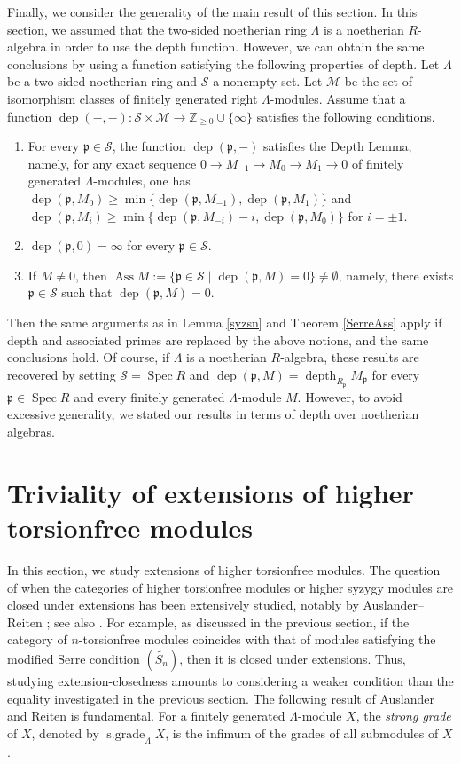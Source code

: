 \documentclass{amsart}
\theoremstyle{definition}
\theoremstyle{remark}
\numberwithin{equation}{thm}
\def\ass{\operatorname{Ass}}
\def\depth{\operatorname{depth}}
\def\ge{\geqslant}
\def\p{\mathfrak{p}}
\def\sgrade{\operatorname{s\text{.}grade}}
\def\spec{\operatorname{Spec}}
\def\ZZ{\mathbb{Z}}
\begin{document}
Finally, we consider the generality of the main result of this section. In this section, we assumed that the two-sided noetherian ring $\Lambda$ is a noetherian $R$-algebra in order to use the depth function. However, we can obtain the same conclusions by using a function satisfying the following properties of depth.
Let $\Lambda$ be a two-sided noetherian ring and $\mathcal{S}$ a nonempty set. Let $\mathcal{M}$ be the set of isomorphism classes of finitely generated right $\Lambda$-modules. Assume that a function $\operatorname{dep}(-,-):\mathcal{S}\times\mathcal{M}\to\ZZ_{\ge0}\cup\{\infty\}$ satisfies the following conditions.
\begin{enumerate}[\rm(1)]
\item For every $\p\in\mathcal{S}$, the function $\operatorname{dep}(\p,-)$ satisfies the Depth Lemma, namely, for any exact sequence $0\to M_{-1}\to M_0\to M_1\to0$ of finitely generated $\Lambda$-modules, one has $\operatorname{dep}(\p,M_0)\ge\min\{\operatorname{dep}(\p,M_{-1}),\operatorname{dep}(\p,M_1)\}$ and $\operatorname{dep}(\p,M_i)\ge\min\{\operatorname{dep}(\p,M_{-i})-i,\operatorname{dep}(\p,M_0)\}$ for $i=\pm1$.
\item $\operatorname{dep}(\p,0)=\infty$ for every $\p\in\mathcal{S}$.
\item If $M\ne0$, then $\ass M:=\{\p\in\mathcal{S}\mid\operatorname{dep}(\p,M)=0\}\ne\emptyset$, namely, there exists $\p\in\mathcal{S}$ such that $\operatorname{dep}(\p,M)=0$.
\end{enumerate}
Then the same arguments as in Lemma \ref{syzsn} and Theorem \ref{SerreAss} apply if depth and associated primes are replaced by the above notions, and the same conclusions hold. Of course, if $\Lambda$ is a noetherian $R$-algebra, these results are recovered by setting $\mathcal{S}=\spec R$ and $\operatorname{dep}(\p,M)=\depth_{R_\p}M_\p$ for every $\p\in\spec R$ and every finitely generated $\Lambda$-module $M$. However, to avoid excessive generality, we stated our results in terms of depth over noetherian algebras.

\section{Triviality of extensions of higher torsionfree modules}
In this section, we study extensions of higher torsionfree modules. The question of when the categories of higher torsionfree modules or higher syzygy modules are closed under extensions has been extensively studied, notably by Auslander--Reiten \cite{AR1,AR2}; see also \cite{DT,GT,Huang99,Hu06,Hu09,HI}. For example, as discussed in the previous section, if the category of $n$-torsionfree modules coincides with that of modules satisfying the modified Serre condition $(\widetilde{S_n})$, then it is closed under extensions. Thus, studying extension-closedness amounts to considering a weaker condition than the equality investigated in the previous section.
The following result of Auslander and Reiten \cite[Theorem 1.6]{AR2} is fundamental.
For a finitely generated $\Lambda$-module $X$, the {\em strong grade} of $X$, denoted by $\sgrade_\Lambda X$, is the infimum of the grades of all submodules of $X$.
\end{document}
